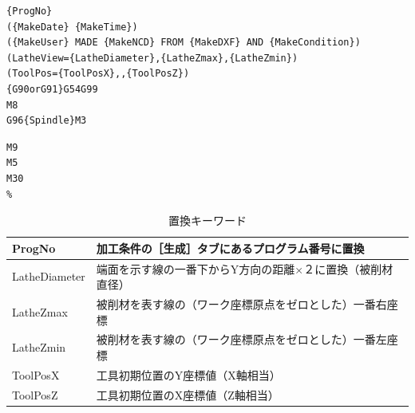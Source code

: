 \begin{minipage}[t]{0.75\textwidth}
\begin{lstlisting}[caption=Header.txt,numbers=none,label=lst:header.txt]
%
{ProgNo}
({MakeDate} {MakeTime})
({MakeUser} MADE {MakeNCD} FROM {MakeDXF} AND {MakeCondition})
(LatheView={LatheDiameter},{LatheZmax},{LatheZmin})
(ToolPos={ToolPosX},,{ToolPosZ})
{G90orG91}G54G99
M8
G96{Spindle}M3
\end{lstlisting}
\end{minipage}
\begin{minipage}[t]{0.25\textwidth}
\begin{lstlisting}[caption=Footer.txt,numbers=none,label=lst:footer.txt]
M9
M5
M30
%
\end{lstlisting}
\end{minipage}

\begin{table}[H]
\centering
\caption{置換キーワード}
\label{tab:keyword}
\begin{tabular}{|p{3cm}|p{10cm}|}
\hline
ProgNo & 加工条件の［生成］タブにあるプログラム番号に置換 \\ \hline
LatheDiameter & 端面を示す線の一番下からY方向の距離×２に置換（被削材直径）\\ \hline
LatheZmax & 被削材を表す線の（ワーク座標原点をゼロとした）一番右座標 \\ \hline
LatheZmin & 被削材を表す線の（ワーク座標原点をゼロとした）一番左座標 \\ \hline
ToolPosX & 工具初期位置のY座標値（X軸相当）\\ \hline
ToolPosZ & 工具初期位置のX座標値（Z軸相当）\\ \hline
\end{tabular}
\end{table}
